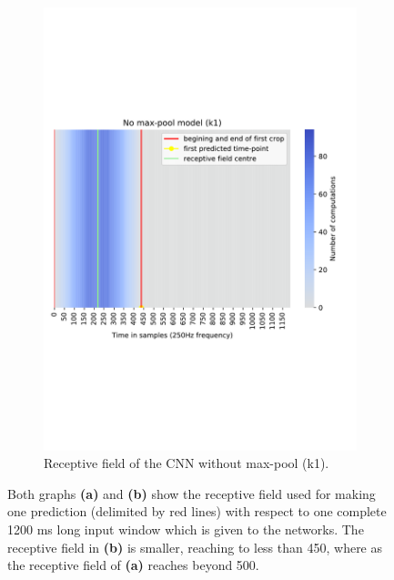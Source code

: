 \begin{figure}[!htpb]
\begin{subfigure}[b]{0.44\textwidth}
   \includegraphics[width=\linewidth]{img/ch3/k1-receptive-field}
   \caption{Receptive field of the CNN without max-pool (k1).}
\end{subfigure}
\caption[Receptive field comparison]{Both graphs \textbf{(a)} and \textbf{(b)} show the receptive field used for making one prediction (delimited by red lines) with respect to one complete 1200 ms long input window which is given to the networks. The receptive field in \textbf{(b)} is smaller, reaching to less than 450, where as the receptive field of \textbf{(a)} reaches beyond 500.} 
\label{fig:receptive-field-comparison}
\end{figure}

